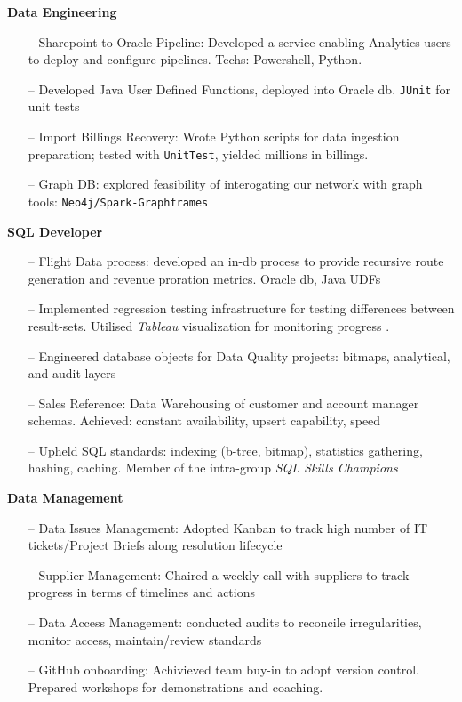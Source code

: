 \documentclass[10pt,a4paper]{altacv}
\begin{document}
\textbf{Data Engineering}
\begin{itemize}
  \setlength{\itemindent}{0.5em}  
  \item[--]   \small{Sharepoint to Oracle Pipeline: Developed a service enabling Analytics users to deploy and configure pipelines. Techs: Powershell, Python. }
    \item[--]   \small{Developed Java User Defined Functions, deployed into Oracle db. \texttt{JUnit} for unit tests} 
    \item[--]   \small{Import Billings Recovery: Wrote Python scripts for data ingestion preparation;  tested with \texttt{UnitTest}, yielded millions in billings.} 
    \item[--]   \small{Graph DB: explored feasibility of interogating our network with graph tools: \texttt{Neo4j/Spark-Graphframes}} 
\end{itemize}
\textbf{SQL Developer}
\begin{itemize}
  \item[--]   \small{Flight Data process: developed an in-db process to provide recursive route generation and revenue proration metrics. Oracle db, Java UDFs} 
  \item[--]   \small{Implemented regression testing infrastructure for testing differences between result-sets. Utilised \textit{Tableau} visualization for monitoring progress .} 
  \item[--]   \small{Engineered database objects for Data Quality projects: bitmaps, analytical, and audit layers}
  \item[--]   \small{Sales Reference: Data Warehousing of customer and account manager schemas. Achieved: constant availability, upsert capability, speed} 
  \item[--]   \small{Upheld SQL standards: indexing (b-tree, bitmap), statistics gathering, hashing, caching. Member of the intra-group \textit{SQL Skills Champions}} 
\end{itemize}
\textbf{Data Management}
\begin{itemize}
  \item[--]   \small{Data Issues Management: Adopted Kanban to track high number of IT tickets/Project Briefs along resolution lifecycle}
  \item[--]   \small{Supplier Management: Chaired a weekly call with suppliers to track progress in terms of timelines and actions}  
  \item[--]   \small{Data Access Management: conducted audits to reconcile irregularities, monitor access, maintain/review standards}
  \item[--]   \small{GitHub onboarding: Achivieved team buy-in to adopt version control. Prepared workshops for demonstrations and coaching.} 
\end{itemize}
\end{document}
